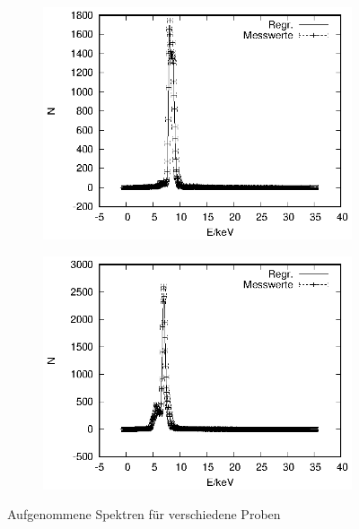\begin{figure}[!h]
\begin{subfigure}[h]{0.5\textwidth}
    \includegraphics{data/Massenanteil/probe_3.eps}
  \end{subfigure}%
  \begin{subfigure}[h]{0.5\textwidth}
    \centering
    \includegraphics{data/Massenanteil/probe_4.eps}
  \end{subfigure}
  \caption{Aufgenommene Spektren für verschiedene Proben}
  \label{fig:proben}
\end{figure}
